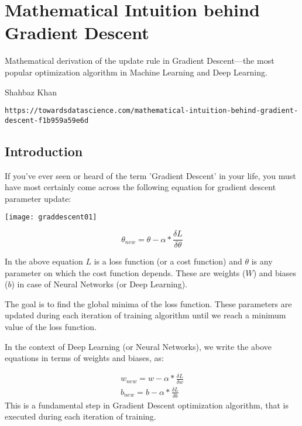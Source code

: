 
\chapter{Mathematical Intuition behind Gradient Descent}
\label{sec:MathematicalIntuitionbehindGradientDescent}


Mathematical derivation of the update rule in Gradient Descent---the most popular optimization algorithm in Machine Learning and Deep Learning.

Shahbaz Khan


\lstinline{https://towardsdatascience.com/mathematical-intuition-behind-gradient-descent-f1b959a59e6d} 

\section{Introduction}

If you've ever seen or heard of the term 'Gradient Descent' in your life, you must have most certainly come across the following equation for gradient descent parameter update:
\begin{marginfigure}
\texttt{[image: graddescent01]}
\end{marginfigure}
\begin{equation}
\theta_{n e w}=\theta-\alpha * \frac{\delta L}{\delta \theta}
\end{equation}

In the above equation $L$ is a loss function (or a cost function) and $\theta$ is any parameter on which the cost function depends. These are weights ($W$) and biases ($b$) in case of Neural Networks (or Deep Learning).

The goal is to find the global minima of the loss function.
These parameters are updated during each iteration of training algorithm until we reach a minimum value of the loss function.

In the context of Deep Learning (or Neural Networks), we write the above equations in terms of weights and biases, as:

\begin{equation}
\begin{array}{c}{w_{n e w}=w-\alpha * \frac{\delta L}{\delta w}} \\ {b_{n e w}=b-\alpha * \frac{\delta L}{\delta b}}\end{array}
\end{equation}
This is a fundamental step in Gradient Descent optimization algorithm, that is executed during each iteration of training.

